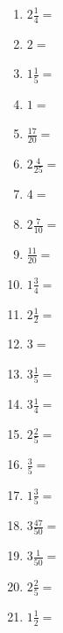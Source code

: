 \documentclass[12pt]{article}
\begin{document}
\begin{enumerate}
\newpage
\item \large $ 2 \frac{1}{4} = $ \vspace{1.5cm}
\item \large $ 2 = $ \vspace{1.5cm}
\item \large $ 1 \frac{1}{5} = $ \vspace{1.5cm}
\item \large $ 1 = $ \vspace{1.5cm}
\item \large $ \frac{17}{20} = $ \vspace{1.5cm}
\item \large $ 2 \frac{4}{25} = $ \vspace{1.5cm}
\item \large $ 4 = $ \vspace{1.5cm}
\item \large $ 2 \frac{7}{10} = $ \vspace{1.5cm}
\item \large $ \frac{11}{20} = $ \vspace{1.5cm}
\item \large $ 1 \frac{3}{4} = $ \vspace{1.5cm}
\newpage
\item \large $ 2 \frac{1}{2} = $ \vspace{1.5cm}
\item \large $ 3 = $ \vspace{1.5cm}
\item \large $ 3 \frac{1}{5} = $ \vspace{1.5cm}
\item \large $ 3 \frac{1}{4} = $ \vspace{1.5cm}
\item \large $ 2 \frac{2}{5} = $ \vspace{1.5cm}
\item \large $ \frac{3}{5} = $ \vspace{1.5cm}
\item \large $ 1 \frac{3}{5} = $ \vspace{1.5cm}
\item \large $ 3 \frac{47}{50} = $ \vspace{1.5cm}
\item \large $ 3 \frac{1}{50} = $ \vspace{1.5cm}
\item \large $ 2 \frac{2}{5} = $ \vspace{1.5cm}
\newpage
\item \large $ 1 \frac{1}{2} = $ \vspace{1.5cm}

\end{enumerate}
\end{document}

